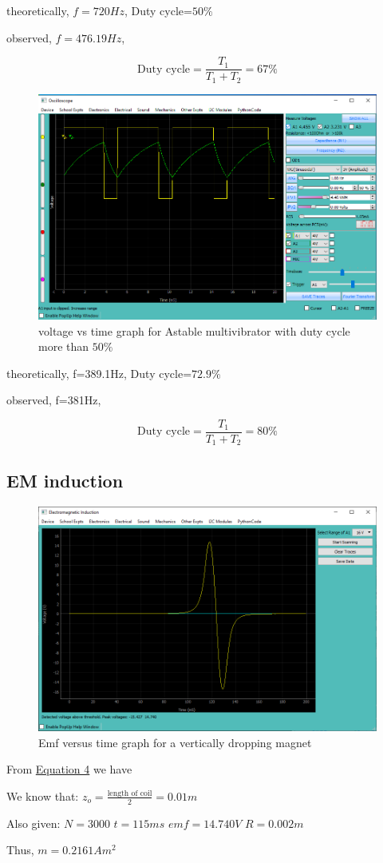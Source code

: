 		theoretically, $f=720Hz$, Duty cycle=$50\%$

		observed, $f=476.19Hz$,
		
		$$\text{Duty cycle}=\frac{T_1}{T_1+T_2}=67\%$$

		\begin{figure}[h]
			\centering
			\includegraphics[width=0.8\columnwidth]{images/dc50.png}
			\caption{ voltage vs time graph for Astable multivibrator with duty cycle more than $50\%$}
			\label{ss:3}
		\end{figure}

		theoretically, f=389.1Hz, Duty cycle=$72.9\%$

		observed, f=381Hz,
		
		$$\text{Duty cycle}=\frac{T_1}{T_1+T_2}=80\%$$

	\subsection{EM induction}
		
		\begin{figure}[h]
			\centering
			\includegraphics[width=0.8\columnwidth]{images/emf.png}
			\caption{Emf versus time graph for a vertically dropping magnet}
			\label{ss:4}
		\end{figure}

		From \hyperref[eq:4]{Equation 4} we have

		We know that: $z_o=\frac{\text{length of coil}}{2} = 0.01 m$

		Also given:
		$N=3000$
		$t = 115 ms$
		$emf = 14.740V$
		$R = 0.002 m$

		Thus, $m=0.2161Am^2$
